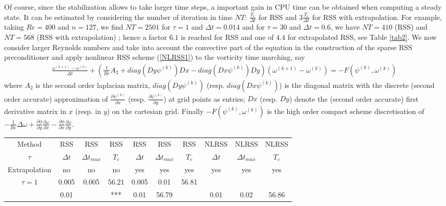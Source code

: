 \documentclass[11pt]{article}
\newcommand{\Frac}[2] {\frac{\textstyle #1} {\textstyle #2}}
\begin{document}
{Of course, since the stabilization allows to take larger time steps, a important gain in CPU time can be obtained when computing a steady state. It can be estimated by considering the number of iteration in time $NT$: $\Frac{T_c}{\Delta t}$ for RSS and  $3\Frac{T_c}{\Delta t}$ for RSS with extrapolation.
For example, taking $Re=400$ and $n=127$, we find $NT=2501$ for $\tau=1$ and $\Delta t=0.014$ and  for $\tau=30$ and $\Delta t=0.6$, we have $NT=410$ (RSS) and $NT=568$ (RSS with extrapolation) ; hence a factor $6.1$ is reached for RSS and one of $4.4$ for extrapolated RSS, see Table \ref{tab2}.
\newpage
We now consider larger Reynolds numbers and take into account the convective part of the equation in the construction of the sparse RSS preconditioner and apply nonlinear RSS scheme (\ref{NLRSS1}) to the vorticity time marching, say
\begin{eqnarray}
\Frac{\omega^{(k+1)}-\omega^{(k)}}{\Delta t} 
+\left(\Frac{1}{Re}A_2+diag(Dy\psi^{(k)}) Dx -diag(Dx\psi^{(k)})Dy\right)(\omega^{(k+1)}-\omega^{(k)})=-F(\psi^{(k)},\omega^{(k)})
\end{eqnarray}
where $A_2$ is the second order laplacian matrix, $diag(Dy\psi^{(k)})$ (resp. $diag(Dx\psi^{(k)})$) is the
diagonal matrix with the discrete (second order accurate) approximation of $\Frac{\partial \psi^{(k)}}{\partial x}$
(resp.  $\Frac{\partial \psi^{(k)}}{\partial y}$) at grid points as entries; $Dx$ (resp. $Dy$) denote the (second order accurate) first derivative matrix in $x$ (resp. in $y$) on the cartesian grid. Finally $-F(\psi^{(k)},\omega^{(k)})$ is the high order compact scheme discretisation of $-\Frac {1}{Re}\Delta \omega
 +\Frac {\partial \phi}{\partial y}
\Frac {\partial \omega}{\partial x} - \Frac {\partial \phi}{\partial
x}
\Frac {\partial \omega}{\partial y}$.
\begin{table}[h!]
\begin{center}
\begin{tabular}{|c||c|c|c||c|c|c||c|c|c|}
\hline
Method & RSS & RSS & RSS & RSS & RSS & RSS & NLRSS & NLRSS & NLRSS\\
$\tau$ & $\Delta t$ & $\Delta t_{max}$ & $T_c$ & $\Delta t$ & $\Delta t_{max}$ & $T_c$&$\Delta t$ & $\Delta t_{max}$ & $T_c$\\
Extrapolation & no  & no  & no  & yes& yes& yes &yes& yes& yes\\
\hline 
\hline 
$\tau = 1$ & 0.005 & 0.005 & 56.21& 0.005 & 0.01 & 56.81 & & &  \\ 
\hline
                  &  0.01       &        &   ***  &     0.01      &  56.79       &   & 0.01 & 0.02 & 56.86 \\ 

\end{tabular}
\end{center}
\end{table}}
\end{document}
